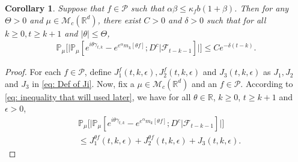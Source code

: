 \documentclass[12pt,a4paper]{amsart}
\theoremstyle{plain}
\newtheorem{cor}[thm]{Corollary}
\theoremstyle{definition}
\numberwithin{equation}{section}
\begin{document}
\begin{cor}\label{cor: used in next corollary}
Suppose that $f\in \mathcal{P}$ such that $\alpha\beta\leq \kappa_fb(1+\beta)$.
Then for any $\Theta >0$ and $\mu\in \mathcal M_c(\mathbb R^d)$,
there exist $C>0$ and $\delta>0$ such that for all $k \geq 0, t\geq k+1$ and $|\theta|\leq \Theta$,
\begin{equation}\begin{split}
    \mathbb{P}_{\mu}\Big[\big|\mathbb{P}_{\mu}[e^{i\theta\gamma_{t,k}}-e^{e^{\alpha}m_k[\theta f]}; D^c | \mathscr F_{t-k-1}]\big|\Big]\leq Ce^{-\delta(t-k)}.
\end{split}\end{equation}
\end{cor}
\begin{proof}
	For each $f\in \mathcal P$, define $J_1^f(t,k,\epsilon), J_2^f(t,k,\epsilon)$ and $J_3(t,k,\epsilon)$ as $J_1, J_2$ and $J_3$ in \eqref{eq: Def of Ji}.
	Now, fix a $\mu \in \mathcal M_c(\mathbb R^d)$ and an $f\in \mathcal P$.
    According to \eqref{eq: inequality that will used later},  we have for all $\theta\in \mathbb R$, $k\geq 0$, $t\geq k+1$ and $\epsilon> 0$,
\begin{equation}\begin{split}
    &\mathbb{P}_{\mu}\Big[\big| \mathbb{P}_{\mu}[e^{i\theta \gamma_{t,k}}-e^{e^{\alpha}m_k[\theta f]}; D^c | \mathscr F_{t-k-1}]\big|\Big]
    \\&\leq J^{\theta f}_1(t,k,\epsilon) + J^{\theta f}_2(t,k,\epsilon)+J_3(t,k,\epsilon).
\end{split}\end{equation}


\end{proof}
\end{document}
